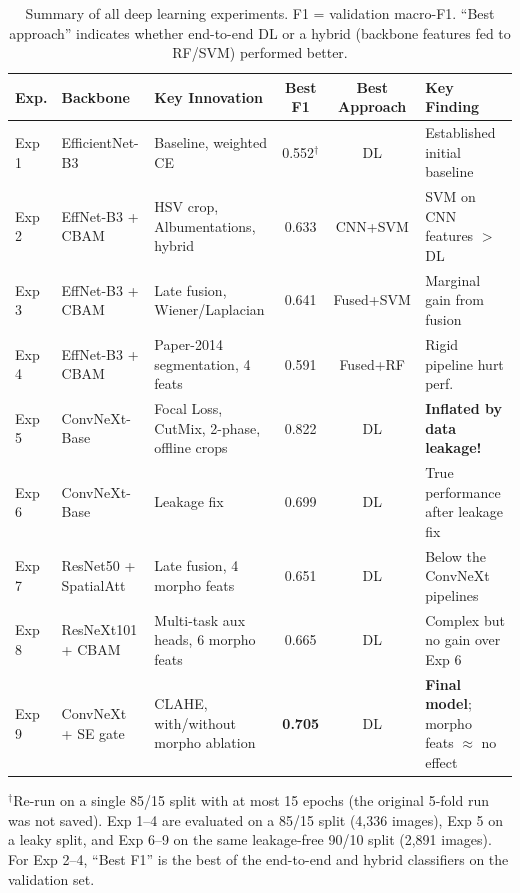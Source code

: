 \documentclass[twocolumn,a4paper]{article}
\begin{document}
\begin{table}[t]
\centering
\caption{Summary of all deep learning experiments. F1 = validation macro-F1. ``Best approach'' indicates whether end-to-end DL or a hybrid (backbone features fed to RF/SVM) performed better.}
\label{tab:iterations}
\footnotesize
\setlength{\tabcolsep}{4pt}
\begin{tabular}{@{}ll>{\raggedright\arraybackslash}p{4.6cm}cc>{\raggedright\arraybackslash}p{4.4cm}@{}}
\toprule
\textbf{Exp.} & \textbf{Backbone} & \textbf{Key Innovation} & \textbf{Best F1} & \textbf{Best Approach} & \textbf{Key Finding} \\
\midrule
Exp 1 & EfficientNet-B3 & Baseline, weighted CE & 0.552$^\dagger$ & DL & Established initial baseline \\
Exp 2 & EffNet-B3 + CBAM & HSV crop, Albumentations, hybrid & 0.633 & CNN+SVM & SVM on CNN features $>$ DL \\
Exp 3 & EffNet-B3 + CBAM & Late fusion, Wiener/Laplacian & 0.641 & Fused+SVM & Marginal gain from fusion \\
Exp 4 & EffNet-B3 + CBAM & Paper-2014 segmentation, 4 feats & 0.591 & Fused+RF & Rigid pipeline hurt perf.\ \\
Exp 5 & ConvNeXt-Base & Focal Loss, CutMix, 2-phase, offline crops & 0.822 & DL & \textbf{Inflated by data leakage!} \\
Exp 6 & ConvNeXt-Base & Leakage fix & 0.699 & DL & True performance after leakage fix \\
Exp 7 & ResNet50 + SpatialAtt & Late fusion, 4 morpho feats & 0.651 & DL & Below the ConvNeXt pipelines \\
Exp 8 & ResNeXt101 + CBAM & Multi-task aux heads, 6 morpho feats & 0.665 & DL & Complex but no gain over Exp 6 \\
Exp 9 & ConvNeXt + SE gate & CLAHE, with/without morpho ablation & \textbf{0.705} & DL & \textbf{Final model}; morpho feats $\approx$ no effect \\
\bottomrule
\end{tabular}

\vspace{2pt}
{\footnotesize $^\dagger$Re-run on a single 85/15 split with at most 15 epochs (the original 5-fold run was not saved). Exp 1--4 are evaluated on a 85/15 split (4,336 images), Exp 5 on a leaky split, and Exp 6--9 on the same leakage-free 90/10 split (2,891 images). For Exp 2--4, ``Best F1'' is the best of the end-to-end and hybrid classifiers on the validation set.}
\end{table}
\end{document}
